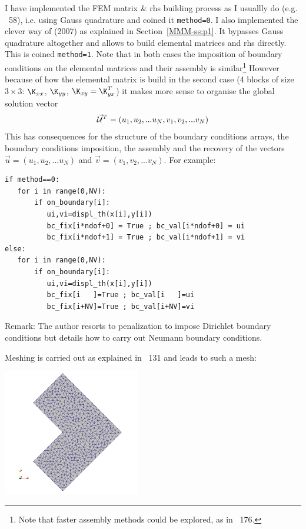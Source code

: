 I have implemented the FEM matrix \& rhs building process as I 
usuallly do (e.g. \stone~58), i.e. using Gauss quadrature and
coined it \lstinline{method=0}.
I also implemented the clever way of \textcite{koko07} (2007)
as explained in Section~\ref{MMM-ss:p1}. It bypasses Gauss quadrature
altogether and allows to build elemental matrices and rhs directly.
This is coined \lstinline{method=1}.
Note that in both cases the imposition of boundary conditions on the 
elemental matrices and their assembly is similar\footnote{Note 
that faster assembly methods could be explored, as in \stone~176.} 
However because of how the elemental matrix is build in the second case
(4 blocks of size $3\times 3$: $\K_{xx}$, $\K_{yy}$, $\K_{xy}=\K_{yx}^T$)
it makes more sense to organise the global solution vector 
\[
\vec{\cal U}^T=(u_1,u_2, ...u_N,v_1,v_2,... v_N)
\]
This has consequences for the structure of the boundary conditions arrays, 
the boundary conditions imposition, the assembly and the recovery of 
the vectors $\vec{u}=(u_1,u_2,...u_N)$ and $\vec{v}=(v_1,v_2,...v_N)$. 
For example:
\begin{lstlisting}
if method==0:
   for i in range(0,NV):
       if on_boundary[i]: 
          ui,vi=displ_th(x[i],y[i])
          bc_fix[i*ndof+0] = True ; bc_val[i*ndof+0] = ui
          bc_fix[i*ndof+1] = True ; bc_val[i*ndof+1] = vi
else:
   for i in range(0,NV):
       if on_boundary[i]: 
          ui,vi=displ_th(x[i],y[i])
          bc_fix[i   ]=True ; bc_val[i   ]=ui
          bc_fix[i+NV]=True ; bc_val[i+NV]=vi
\end{lstlisting}



Remark: The author resorts to penalization to impose Dirichlet 
boundary conditions but details how to carry out Neumann boundary conditions.

Meshing is carried out as explained in \stone~131 and leads to such a mesh:
\begin{center}
\includegraphics[width=6cm]{python_codes/fieldstone_179/RESULTS/mesh}
\end{center}



